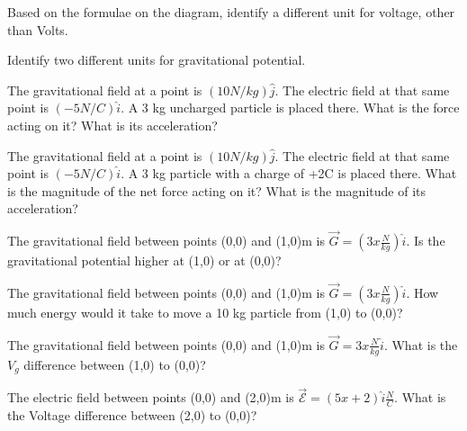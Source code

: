 \begin{alevel}
Based on the formulae on the diagram, identify a different unit for voltage, other than Volts.
\end{alevel}

\begin{alevel}
Identify two different units for gravitational potential.
\end{alevel}

\begin{blevel}
The gravitational field at a point is $(10 N/kg) \hat{j}$. The electric field at that same point is $(-5 N/C) \hat{i}$. A 3 kg uncharged particle is placed there. What is the force acting on it? What is its acceleration?
\end{blevel}

\begin{blevel}
The gravitational field at a point is $(10 N/kg) \hat{j}$. The electric field at that same point is $(-5 N/C) \hat{i}$. A 3 kg particle with a charge of +2C is placed there. What is the magnitude of the net force acting on it? What is the magnitude of its acceleration?
\end{blevel}

\begin{blevel}
The gravitational field between points (0,0) and (1,0)m is $\vec{G}=(3x \frac{N}{kg})\hat{i}$. Is the gravitational potential higher at (1,0) or at (0,0)?
\end{blevel}

\begin{clevel}
The gravitational field between points (0,0) and (1,0)m is $\vec{G}=(3x \frac{N}{kg})\hat{i}$. How much energy would it take to move a 10 kg particle from (1,0) to (0,0)?
\end{clevel}

\begin{clevel}
The gravitational field between points (0,0) and (1,0)m is $\vec{G}=3x \frac{N}{kg}\hat{i}$. What is the $V_g$ difference between (1,0) to (0,0)?
\end{clevel}

\begin{clevel}
The electric field between points (0,0) and (2,0)m is $\vec{\mathcal{E}}=(5x+2)\hat{i} \frac{N}{C}$. What is the Voltage difference between (2,0) to (0,0)?
\end{clevel}


